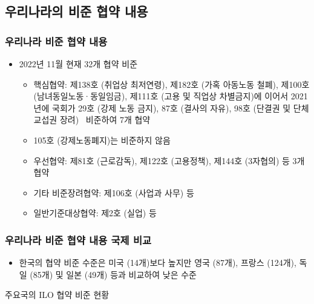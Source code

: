 \documentclass[aspectratio=169,xcolor=dvipsnames,handout]{beamer}
\begin{document}
\subsection{우리나라의 비준 협약 내용}%
\begin{frame}
    \frametitle{우리나라 비준 협약 내용}
    \begin{itemize}[<+->]
        \item 2022년 11월 현재 32개 협약 비준
        \begin{itemize}
            \item 핵심협약:  제138호 (취업상 최저연령), 제182호 (가혹 아동노동 철폐), 제100호 (남녀동일노동·동일임금), 제111호 (고용 및 직업상 차별금지)에 이어서 2021년에 국회가 29호 (강제 노동 금지), 87호 (결사의 자유), 98호 (단결권 및 단체교섭권 장려)  비준하여 7개 협약
            \item 105호 (강제노동폐지)는 비준하지 않음
            \item 우선협약: 제81호 (근로감독), 제122호 (고용정책), 제144호 (3자협의) 등 3개 협약
            \item 기타 비준장려협약: 제106호 (사업과 사무) 등
            \item 일반기준대상협약: 제2호 (실업) 등
        \end{itemize}
    \end{itemize}
\end{frame}

\begin{frame}
    \frametitle{우리나라 비준 협약 내용 국제 비교}
    \begin{itemize}[<+->]
    \item 한국의 협약 비준 수준은 미국 (14개)보다 높지만 영국 (87개), 프랑스 (124개), 독일 (85개) 및 일본 (49개) 등과 비교하여 낮은 수준
    \end{itemize}
    \begin{table}
        \centering
        \resizebox{.6\textwidth}{!}{\relax
            
        }
        \caption{주요국의 ILO 협약 비준 현황}
    \end{table}
\end{frame}
\end{document}

